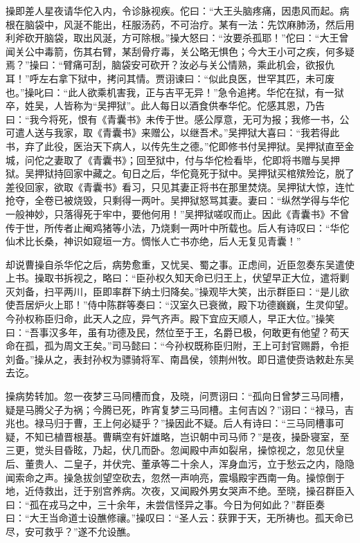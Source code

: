 操即差人星夜请华佗入内，令诊脉视疾。佗曰：“大王头脑疼痛，因患风而起。病根在脑袋中，风涎不能出，枉服汤药，不可治疗。某有一法：先饮麻肺汤，然后用利斧砍开脑袋，取出风涎，方可除根。”操大怒曰：“汝要杀孤耶！”佗曰：“大王曾闻关公中毒箭，伤其右臂，某刮骨疗毒，关公略无惧色；今大王小可之疾，何多疑焉？”操曰：“臂痛可刮，脑袋安可砍开？汝必与关公情熟，乘此机会，欲报仇耳！”呼左右拿下狱中，拷问其情。贾诩谏曰：“似此良医，世罕其匹，未可废也。”操叱曰：“此人欲乘机害我，正与吉平无异！”急令追拷。华佗在狱，有一狱卒，姓吴，人皆称为“吴押狱”。此人每日以酒食供奉华佗。佗感其恩，乃告曰：“我今将死，恨有《青囊书》未传于世。感公厚意，无可为报；我修一书，公可遣人送与我家，取《青囊书》来赠公，以继吾术。”吴押狱大喜曰：“我若得此书，弃了此役，医治天下病人，以传先生之德。”佗即修书付吴押狱。吴押狱直至金城，问佗之妻取了《青囊书》；回至狱中，付与华佗检看毕，佗即将书赠与吴押狱。吴押狱持回家中藏之。旬日之后，华佗竟死于狱中。吴押狱买棺殡殓讫，脱了差役回家，欲取《青囊书》看习，只见其妻正将书在那里焚烧。吴押狱大惊，连忙抢夺，全卷已被烧毁，只剩得一两叶。吴押狱怒骂其妻。妻曰：“纵然学得与华佗一般神妙，只落得死于牢中，要他何用！”吴押狱嗟叹而止。因此《青囊书》不曾传于世，所传者止阉鸡猪等小法，乃烧剩一两叶中所载也。后人有诗叹曰：“华佗仙术比长桑，神识如窥垣一方。惆怅人亡书亦绝，后人无复见青囊！”

却说曹操自杀华佗之后，病势愈重，又忧吴、蜀之事。正虑间，近臣忽奏东吴遣使上书。操取书拆视之，略曰：“臣孙权久知天命已归王上，伏望早正大位，遣将剿灭刘备，扫平两川，臣即率群下纳土归降矣。”操观毕大笑，出示群臣曰：“是儿欲使吾居炉火上耶！”侍中陈群等奏曰：“汉室久已衰微，殿下功德巍巍，生灵仰望。今孙权称臣归命，此天人之应，异气齐声。殿下宜应天顺人，早正大位。”操笑曰：“吾事汉多年，虽有功德及民，然位至于王，名爵已极，何敢更有他望？苟天命在孤，孤为周文王矣。”司马懿曰：“今孙权既称臣归附，王上可封官赐爵，令拒刘备。”操从之，表封孙权为骠骑将军、南昌侯，领荆州牧。即日遣使赍诰敕赴东吴去讫。

操病势转加。忽一夜梦三马同槽而食，及晓，问贾诩曰：“孤向日曾梦三马同槽，疑是马腾父子为祸；今腾已死，昨宵复梦三马同槽。主何吉凶？”诩曰：“禄马，吉兆也。禄马归于曹，王上何必疑乎？”操因此不疑。后人有诗曰：“三马同槽事可疑，不知已植晋根基。曹瞒空有奸雄略，岂识朝中司马师？”是夜，操卧寝室，至三更，觉头目昏眩，乃起，伏几而卧。忽闻殿中声如裂帛，操惊视之，忽见伏皇后、董贵人、二皇子，并伏完、董承等二十余人，浑身血污，立于愁云之内，隐隐闻索命之声。操急拔剑望空砍去，忽然一声响亮，震塌殿宇西南一角。操惊倒于地，近侍救出，迁于别宫养病。次夜，又闻殿外男女哭声不绝。至晓，操召群臣入曰：“孤在戎马之中，三十余年，未尝信怪异之事。今日为何如此？”群臣奏曰：“大王当命道士设醮修禳。”操叹曰：“圣人云：获罪于天，无所祷也。孤天命已尽，安可救乎？”遂不允设醮。

